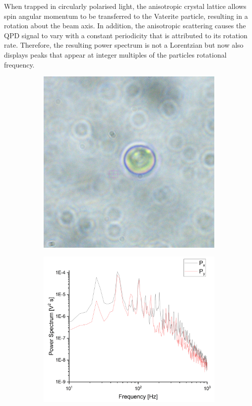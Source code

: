 When trapped in circularly polarised light, the anisotropic crystal lattice
allows spin angular momentum to be transferred to the Vaterite particle, 
resulting in a rotation about the beam axis. In addition, the anisotropic 
scattering causes the QPD signal to vary with a constant periodicity that
is attributed to its rotation rate. Therefore, the resulting power spectrum 
is not a Lorentzian but now also displays peaks that appear at integer 
multiples of the particles rotational frequency. 
\begin{figure}[h!]
	\centering
	\begin{subfigure}{0.4\linewidth}
		\includegraphics[width=\linewidth]{vaterite_sample.jpg}
		\subcaption{}
	\end{subfigure}
	\begin{subfigure}{0.55\linewidth}
		\includegraphics[width=\linewidth]{rotating_psd.png}

\end{subfigure}
\end{figure}
